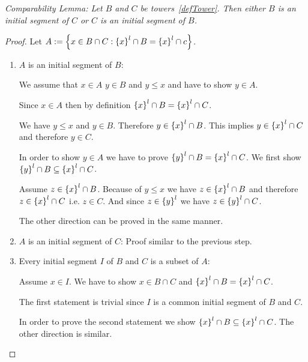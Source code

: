 \begin{lemma}
    \label{thmTowersComparable}
    \emph{
        Comparability Lemma:
        Let $B$ and $C$ be towers~\ref{defTower}. Then either $B$ is an initial
        segment of $C$ or $C$ is an initial segment of $B$.
    }

    \begin{proof}
        Let $A := \left\{x \in B \cap C: \left\{x\right\}^l \cap B = \left\{x\right\}^l \cap c\right\}$.

        \begin{enumerate}
            \item $A$ is an initial segment of $B$:

                We assume that $x \in A$ $y \in B$ and $y \le x$ and have to
                show $y \in A$.

                Since $x \in A$ then by definition $\left\{x\right\}^l \cap B = \left\{x\right\}^l
                \cap C$.

                We have $y \le x$ and $y \in B$. Therefore $y \in \left\{x\right\}^l \cap
                B$. This implies $y \in \left\{x\right\}^l \cap C$ and therefore $y \in
                C$.

                In order to show $y \in A$ we have to prove $\left\{y\right\}^l \cap B =
                \left\{x\right\}^l \cap C$. We first show $\left\{y\right\}^l \cap B \subseteq
                \left\{x\right\}^l \cap C$.

                Assume $z \in \left\{x\right\}^l \cap B$. Because of $y \le x$ we have $z
                \in \left\{x\right\}^l \cap B$ and therefore $z \in \left\{x\right\}^l \cap C$
                i.e. $z \in C$. And since $z \in \left\{y\right\}^l$ we have $z \in
                \left\{y\right\}^l \cap C$.

                The other direction can be proved in the same manner.

            \item $A$ is an initial segment of $C$: Proof similar to the previous
                step.

            \item Every initial segment $I$ of $B$ and $C$ is a subset of $A$:

                Assume $x \in I$. We have to show $x \in B \cap C$ and
                $\left\{x\right\}^l \cap B = \left\{x\right\}^l \cap C$.

                The first statement is trivial since $I$ is a common initial
                segment of $B$ and $C$.

                In order to prove the second statement we show $\left\{x\right\}^l \cap B
                \subseteq \left\{x\right\}^l \cap C$. The other direction is similar.


\end{enumerate}
\end{proof}
\end{lemma}
